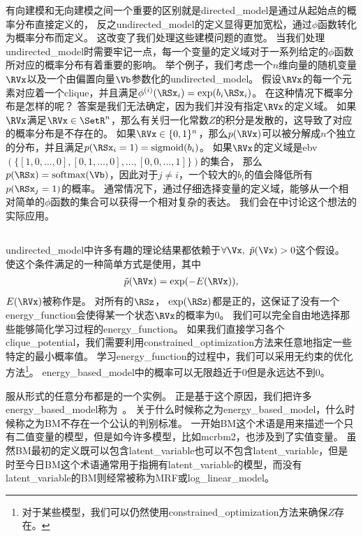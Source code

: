有向建模和无向建模之间一个重要的区别就是\gls{directed_model}是通过从起始点的概率分布直接定义的，
反之\gls{undirected_model}的定义显得更加宽松，通过$\phi$函数转化为概率分布而定义。
这改变了我们处理这些建模问题的直觉。
当我们处理\gls{undirected_model}时需要牢记一点，每一个变量的定义域对于一系列给定的$\phi$函数所对应的概率分布有着重要的影响。
举个例子，我们考虑一个$n$维向量的随机变量$\RVx$以及一个由偏置向量$\Vb$参数化的\gls{undirected_model}。
假设$\RVx$的每一个元素对应着一个\gls{clique}，并且满足$\phi^{(i)}(\RSx_i) = \exp(b_i\RSx_i)$。
在这种情况下概率分布是怎样的呢？
答案是我们无法确定，因为我们并没有指定$\RVx$的定义域。
如果$\RVx$满足$\RVx \in \SetR^n$，那么有关归一化常数$Z$的积分是发散的，这导致了对应的概率分布是不存在的。
如果$\RVx\in\{0,1\}^n$，那么$p(\RVx)$可以被分解成$n$个独立的分布，并且满足$p(\RSx_i=1) = \text{sigmoid}(b_i)$。
如果$\RVx$的定义域是\gls{ebv} $(\{[1,0,\ldots,0],[0,1,\ldots,0],\ldots,[0,0,\ldots,1]\})$的集合，
那么$p(\RSx) = \text{softmax}(\Vb)$，因此对于$j\neq i$，一个较大的$b_i$的值会降低所有$p(\RSx_j = 1)$的概率。
通常情况下，通过仔细选择变量的定义域，能够从一个相对简单的$\phi$函数的集合可以获得一个相对复杂的表达。
我们会在中讨论这个想法的实际应用。


\subsection{}
\label{sec:energy_based_models}


\gls{undirected_model}中许多有趣的理论结果都依赖于$\forall \Vx,\ \tilde{p}(\Vx)>0$这个假设。
使这个条件满足的一种简单方式是使用，其中
\begin{align}
\label{eqn:167}
\tilde{p}(\RVx) = \exp(-E(\RVx)),
\end{align}
$E(\RVx)$被称作是。
对所有的$\RSz$， $\exp(\RSz)$都是正的，这保证了没有一个\gls{energy_function}会使得某一个状态$\RVx$的概率为$0$。
我们可以完全自由地选择那些能够简化学习过程的\gls{energy_function}。
如果我们直接学习各个\gls{clique_potential}，我们需要利用\gls{constrained_optimization}方法来任意地指定一些特定的最小概率值。
学习\gls{energy_function}的过程中，我们可以采用无约束的优化方法\footnote{对于某些模型，我们可以仍然使用\gls{constrained_optimization}方法来确保$Z$存在。}。
\gls{energy_based_model}中的概率可以无限趋近于$0$但是永远达不到$0$。


服从形式的任意分布都是的一个实例。
正是基于这个原因，我们把许多\gls{energy_based_model}称为~\citep{Fahlman83,Ackley85,Hinton84,Hinton86a}。
关于什么时候称之为\gls{energy_based_model}，什么时候称之为\gls{BM}不存在一个公认的判别标准。
一开始\gls{BM}这个术语是用来描述一个只有二值变量的模型，但是如今许多模型，比如\gls{mcrbm2}，也涉及到了实值变量。
虽然\gls{BM}最初的定义既可以包含\gls{latent_variable}也可以不包含\gls{latent_variable}，但是时至今日\gls{BM}这个术语通常用于指拥有\gls{latent_variable}的模型，而没有\gls{latent_variable}的\gls{BM}则经常被称为\gls{MRF}或\gls{log_linear_model}。



